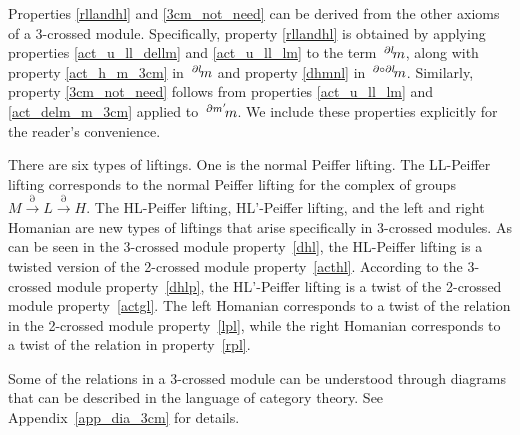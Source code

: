 \documentclass{tac}
\newcommand{\act}[1]{\,\sp{#1}\!}
\newcommand{\del}{\partial}
\begin{document}
\begin{rem}
Properties \ref{rllandhl} and \ref{3cm_not_need} can be derived from the other axioms of a 3-crossed module. Specifically, property \ref{rllandhl} is obtained by applying properties \ref{act_u_ll_dellm} and \ref{act_u_ll_lm} to the term $\act{\del l}m$, along with property \ref{act_h_m_3cm} in $\act{\del l}m$ and property \ref{dhmnl} in $\act{\del \circ \del l}m$. Similarly, property \ref{3cm_not_need} follows from properties \ref{act_u_ll_lm} and \ref{act_delm_m_3cm} applied to $\act{\del m'}m$. We include these properties explicitly for the reader's convenience.
\end{rem}

There are six types of liftings. One is the normal Peiffer lifting. The LL-Peiffer lifting corresponds to the normal Peiffer lifting for the complex of groups \( M \xrightarrow{\partial} L \xrightarrow{\partial} H \).
The HL-Peiffer lifting, HL'-Peiffer lifting, and the left and right Homanian are new types of liftings that arise specifically in 3-crossed modules.
As can be seen in the 3-crossed module property~\ref{dhl}, the HL-Peiffer lifting is a twisted version of the 2-crossed module property~\ref{acthl}. According to the 3-crossed module property~\ref{dhlp}, the HL'-Peiffer lifting is a twist of the 2-crossed module property~\ref{actgl}.
The left Homanian corresponds to a twist of the relation in the 2-crossed module property~\ref{lpl}, while the right Homanian corresponds to a twist of the relation in property~\ref{rpl}.

Some of the relations in a 3-crossed module can be understood through diagrams that can be described in the language of category theory.  
See Appendix~\ref{app_dia_3cm} for details.
\end{document}
